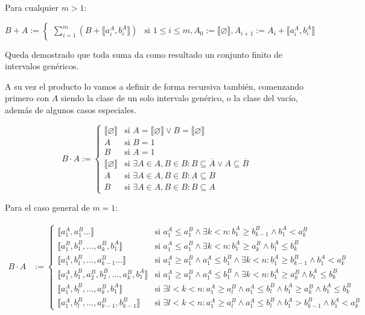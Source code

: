 \begin{enumerate}
Para cualquier $m > 1$:

\[
B + A := \begin{cases}
  \sum_{i=1}^{m} \left( B + \llbracket a_i^A, b_i^A \rrbracket \right) & \text{si } 1 \le i \le m, A_0 := \llbracket \varnothing \rrbracket, A_{i+1} := A_i + \llbracket a_i^A, b_i^A \rrbracket
\end{cases}
\]

Queda demostrado que toda suma da como resultado un conjunto finito de intervalos genéricos.

A su vez el producto lo vamos a definir de forma recursiva también, comenzando primero con $A$ siendo la clase de un solo intervalo genérico, o la clase del vacío, además de algunos casos especiales.

\[
B \cdot A := \begin{cases}
  \llbracket \varnothing \rrbracket & \text{si } A = \llbracket \varnothing \rrbracket \lor B = \llbracket \varnothing \rrbracket \\
  A & \text{si } B = 1 \\
  B & \text{si } A = 1 \\
  \llbracket \varnothing \rrbracket & \text{si } \exists A \in A, B \in B : B \subseteq \overline{A} \lor A \subseteq \overline{B} \\
  A & \text{si } \exists A \in A, B \in B : A \subseteq B \\
  B & \text{si } \exists A \in A, B \in B : B \subseteq A
\end{cases}
\]

Para el caso general de $m = 1$:

\begin{align*}
B \cdot A &:= \begin{cases}
  \llbracket a_1^A, a_1^B \dots \rrbracket & \text{si } a_1^A \le a_1^B \land \exists k<n : b_1^A \ge b_{k-1}^B \land b_1^A < a_k^B \\
  \llbracket a_1^B, b_1^B, \ldots, a_k^B, b_1^A \rrbracket & \text{si } a_1^A \le a_1^B \land \exists k<n : b_1^A \ge a_k^B \land b_1^A \le b_k^B \\
  \llbracket a_1^A, b_1^B, \ldots, a_{k-1}^B \dots \rrbracket & \text{si } a_1^A \ge a_1^B \land a_1^A \le b_1^B \land \exists k<n : b_1^A \ge b_{k-1}^B \land b_1^A < a_k^B \\
  \llbracket a_1^A, b_1^B, a_2^B, b_2^B, \ldots, a_k^B, b_1^A \rrbracket & \text{si } a_1^A \ge a_1^B \land a_1^A \le b_1^B \land \exists k<n : b_1^A \ge a_k^B \land b_1^A \le b_k^B \\
  \llbracket a_1^A, b_l^B, \dots, a_k^B, b_1^A \rrbracket & \text{si } \exists l<k<n : a_1^A \ge a_l^B \land a_1^A \le b_l^B \land b_1^A \ge a_k^B \land b_1^A \le b_k^B \\
  \llbracket a_1^A, b_l^B, \dots, a_{k-1}^B, b_{k-1}^B \rrbracket & \text{si } \exists l<k<n : a_1^A \ge a_l^B \land a_1^A \le b_l^B \land b_1^A > b_{k-1}^B \land b_1^A < a_k^B
\end{cases}
\end{align*}


\end{enumerate}
